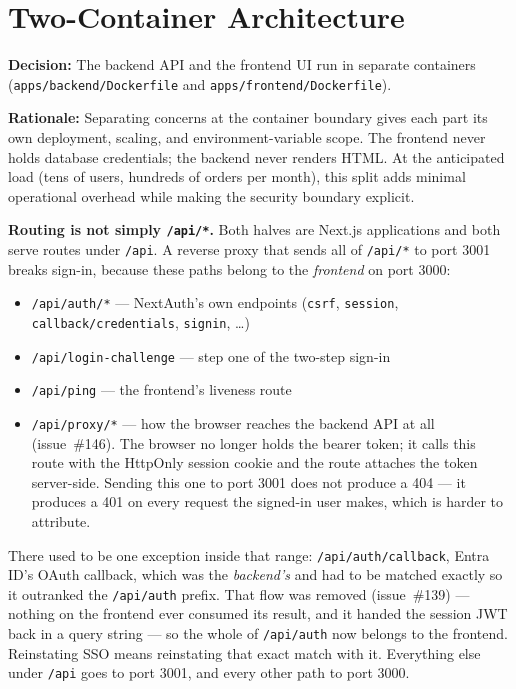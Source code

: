 \documentclass[12pt,a4paper,twoside]{report}
\newcommand{\code}[1]{\texttt{#1}}
\begin{document}
\section{Two-Container Architecture}

\textbf{Decision:} The backend API and the frontend UI run in separate
containers (\code{apps/backend/Dockerfile} and
\code{apps/frontend/Dockerfile}).

\textbf{Rationale:}
Separating concerns at the container boundary gives each part its own
deployment, scaling, and environment-variable scope. The frontend never
holds database credentials; the backend never renders HTML. At the
anticipated load (tens of users, hundreds of orders per month), this
split adds minimal operational overhead while making the security
boundary explicit.

\textbf{Routing is not simply \code{/api/*}.} Both halves are Next.js
applications and both serve routes under \code{/api}. A reverse proxy that
sends all of \code{/api/*} to port 3001 breaks sign-in, because these paths
belong to the \emph{frontend} on port 3000:

\begin{itemize}
  \item \code{/api/auth/*} --- NextAuth's own endpoints (\code{csrf},
        \code{session}, \code{callback/credentials}, \code{signin}, \ldots)
  \item \code{/api/login-challenge} --- step one of the two-step sign-in
  \item \code{/api/ping} --- the frontend's liveness route
  \item \code{/api/proxy/*} --- how the browser reaches the backend API at all
        (issue~\#146). The browser no longer holds the bearer token; it calls
        this route with the HttpOnly session cookie and the route attaches the
        token server-side. Sending this one to port 3001 does not produce a 404
        --- it produces a 401 on every request the signed-in user makes, which
        is harder to attribute.
\end{itemize}

\noindent
There used to be one exception inside that range: \code{/api/auth/callback},
Entra ID's OAuth callback, which was the \emph{backend's} and had to be matched
exactly so it outranked the \code{/api/auth} prefix. That flow was removed
(issue~\#139) --- nothing on the frontend ever consumed its result, and it handed
the session JWT back in a query string --- so the whole of \code{/api/auth} now
belongs to the frontend. Reinstating SSO means reinstating that exact match with
it. Everything else under \code{/api} goes to port 3001, and every other path to
port 3000.
\end{document}
